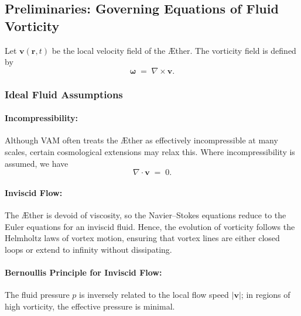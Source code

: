 \subsection{Preliminaries: Governing Equations of Fluid Vorticity}
Let \(\mathbf{v}(\mathbf{r},t)\) be the local velocity field of the Æther. The vorticity field is defined by
\[
    \boldsymbol{\omega} \;=\; \nabla \times \mathbf{v}.
\]

\subsubsection{Ideal Fluid Assumptions}
\paragraph{Incompressibility:}
Although VAM often treats the Æther as effectively incompressible at many scales, certain cosmological extensions may relax this. Where incompressibility is assumed, we have
\[
    \nabla \cdot \mathbf{v} \;=\; 0.
\]

\paragraph{Inviscid Flow:}
The Æther is devoid of viscosity, so the Navier–Stokes equations reduce to the Euler equations for an inviscid fluid. Hence, the evolution of vorticity follows the Helmholtz laws of vortex motion, ensuring that vortex lines are either closed loops or extend to infinity without dissipating.

\paragraph{Bernoulli\rqs s Principle for Inviscid Flow:}
The fluid pressure \(p\) is inversely related to the local flow speed \(\lvert \mathbf{v} \rvert\); in regions of high vorticity, the effective pressure is minimal.

